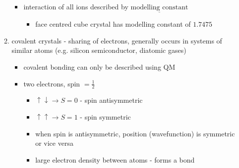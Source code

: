 \documentclass[a4paper,11pt,normalem]{article}
\begin{document}
\begin{enumerate}
\begin{enumerate}
\begin{itemize}
                    \item interaction of all ions described by \(\underline{\text{modelling constant}}\)
                        \begin{itemize}
                            \item face centred cube crystal has modelling constant of \(1.7475\)
                        \end{itemize}
                \end{itemize}
          \item covalent crystals - sharing of electrons, generally occurs in systems of similar atoms (e.g. silicon semiconductor, diatomic gases)
              \begin{itemize}
                  \item covalent bonding can only be described using QM
                  \item two electrons, spin \(= \frac{1}{2}\)
                      \begin{itemize}
                          \item \(\uparrow \downarrow \to S = 0\) - spin antisymmetric
                          \item \(\uparrow \uparrow \to S = 1\) - spin symmetric
                          \item when spin is antisymmetric, position (wavefunction) is symmetric or vice versa
                          \item large electron density between atoms - forms a bond
                      \end{itemize}
              \end{itemize}
        \end{enumerate}
\end{enumerate}

\section{}
\end{document}
